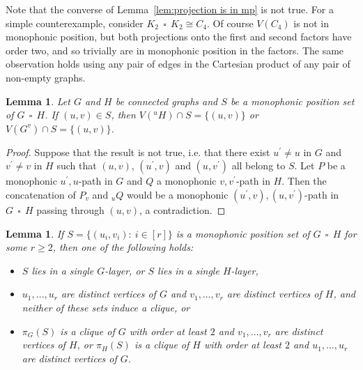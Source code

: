 \documentclass[12pt]{article}
\newtheorem{lemma}[theorem]{Lemma}
\DeclareMathOperator{\cp}{\,\square\,}
\begin{document}
 Note that the converse of Lemma~\ref{lem:projection is in mp} is not true. For a simple counterexample, consider $K_2 \cp K_2 \cong C_4$. Of course $V(C_4)$ is not in monophonic position, but both projections onto the first and second factors have order two, and so trivially are in monophonic position in the factors. The same observation holds using any pair of edges in the Cartesian product of any pair of non-empty graphs.    
 

 \begin{lemma}
 \label{lemma:either G or H layer}
 Let $G$ and $H$ be connected graphs and $S$ be a monophonic position set of $G\cp H$. If $(u,v)\in S$, then $V(^{u}{H})\cap S=\{ (u,v)\}$ or $V(G^v)\cap S=\{ (u,v)\}$.
 \end{lemma}
 
 \begin{proof} 
 Suppose that the result is not true, i.e. that there exist $u^{\prime } \not = u$ in $G$ and $v^{\prime } \not = v$ in $H$ such that $(u,v)$, $(u^{\prime },v)$ and $(u,v^{\prime })$ all belong to $S$. Let $P$ be a monophonic $u^{\prime },u$-path in $G$ and $Q$ a monophonic $v,v^{\prime }$-path in $H$. Then the concatenation of $P_v$ and $_{u}Q$ would be a monophonic $(u^{\prime },v),(u,v^{\prime })$-path in $G \cp H$ passing through $(u,v)$, a contradiction.  
\end{proof}

\begin{lemma}
\label{projection}
If $S = \{(u_i,v_i):\ i\in [r]\}$ is a monophonic position set of $G \cp H$ for some $r \geq 2$, then one of the following holds:
\begin{itemize}
    \item[$($a$)$] $S$ lies in a single $G$-layer, or $S$ lies in a single $H$-layer,
    \item[$($b$)$] $u_1,\dots ,u_{r}$ are distinct vertices of $G$ and $v_1,\dots ,v_{r}$ are distinct vertices of $H$, and neither of these sets induce a clique, or
    \item[$($c$)$] $\pi_G(S)$ is a clique of $G$ with order at least $2$ and $v_1,\dots ,v_{r}$ are distinct vertices of $H$, or $\pi_H(S)$ is a clique of $H$ with order at least $2$ and $u_1,\dots ,u_{r}$ are distinct vertices of $G$.
\end{itemize}
\end{lemma}
\end{document}
